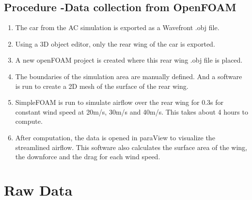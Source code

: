 \documentclass[11pt, a4paper]{article}
\begin{document}
\subsection{Procedure -Data collection from OpenFOAM}
\begin{enumerate}
    \item The car from the AC simulation is exported as a Wavefront .obj file.
    \item Using a 3D object editor, only the rear wing of the car is exported.
    \item A new openFOAM project is created where this rear wing .obj file is placed. 
    \item The boundaries of the simulation area are manually defined. And a software is run to create a 2D mesh of the surface of the rear wing.
    \item SimpleFOAM is run to simulate airflow over the rear wing for 0.3s for constant wind speed at 20m/s, 30m/s and 40m/s. This takes about 4 hours to compute.
    \item After computation, the data is opened in paraView to visualize the streamlined airflow. This software also calculates the surface area of the wing, the downforce  and the drag for each wind speed.
\end{enumerate}

\section{Raw Data}
\end{document}
